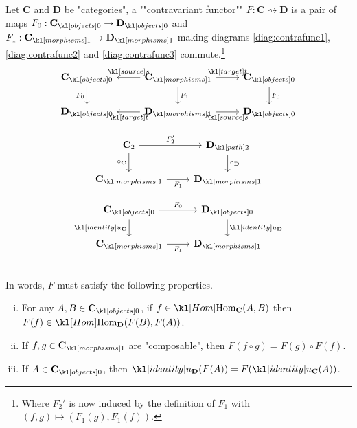 \documentclass[main.tex]{subfiles}
\begin{document}
\begin{defn}\label{defn:contrafunc}
	\AP Let $\mathbf{C}$ and $\mathbf{D}$ be "categories", a ""contravariant functor"" $F: \mathbf{C} \rightsquigarrow \mathbf{D}$ is a pair of maps $F_0:\obj{\mathbf{C}} \rightarrow \obj{\mathbf{D}}$ and $F_1:\mor{\mathbf{C}} \rightarrow \mor{\mathbf{D}}$ making diagrams \eqref{diag:contrafunc1}, \eqref{diag:contrafunc2} and \eqref{diag:contrafunc3} commute.\footnote{Where $F_2'$ is now induced by the definition of $F_1$ with $(f,g) \mapsto (F_1(g), F_1(f))$.}
	\begin{equation}\label{diag:contrafunc1}
	\begin{tikzcd}
	\obj{\mathbf{C}} \arrow[d, "F_0"'] & \mor{\mathbf{C}} \arrow[d, "F_1"] \arrow[l, "\source"'] \arrow[r, "\target"] & \obj{\mathbf{C}} \arrow[d, "F_0"] \\
	\obj{\mathbf{D}} & \mor{\mathbf{D}} \arrow[l, "\target"] \arrow[r, "\source"'] & \obj{\mathbf{D}}
	\end{tikzcd}
	\end{equation}
	\begin{minipage}{0.49\textwidth}
		\begin{equation}\label{diag:contrafunc2}
		\begin{tikzcd}
		\mathbf{C}_2 \arrow[d, "\circ_{\mathbf{C}}"'] \arrow[r, "F_2'"] & \mortwo{\mathbf{D}} \arrow[d, "\circ_{\mathbf{D}}"] \\
		\mor{\mathbf{C}} \arrow[r, "F_1"'] & \mor{\mathbf{D}}
		\end{tikzcd}
		\end{equation}
	\end{minipage}
	\begin{minipage}{0.49\textwidth}
		\begin{equation}\label{diag:contrafunc3}
		\begin{tikzcd}
		\obj{\mathbf{C}} \arrow[d, "\idu_{\mathbf{C}}"'] \arrow[r, "F_0"] & \obj{\mathbf{D}} \arrow[d, "\idu_{\mathbf{D}}"] \\
		\mor{\mathbf{C}} \arrow[r, "F_1"'] & \mor{\mathbf{D}}
		\end{tikzcd}
		\end{equation}
	\end{minipage}\\
	In words, $F$ must satisfy the following properties.
	\begin{enumerate}[i.]
		\item For any $A, B \in \obj{\mathbf{C}}$, if $f \in \Hom_{\mathbf{C}}(A,B)$ then $F(f) \in \Hom_{\mathbf{D}}(F(B), F(A))$.
		\item If $f,g \in \mor{\mathbf{C}}$ are "composable", then $F(f\circ g) = F(g) \circ F(f)$.
		\item If $A \in \obj{\mathbf{C}}$, then $\idu_{\mathbf{D}}(F(A)) = F(\idu_{\mathbf{C}}(A))$.
	\end{enumerate}
\end{defn}
\end{document}
